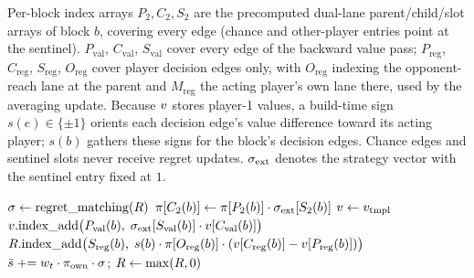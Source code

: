 Per-block index arrays $P_2, C_2, S_2$ are the precomputed dual-lane parent/child/slot
arrays of block $b$, covering every edge (chance and other-player entries point at the
sentinel). $P_{\mathrm{val}}$, $C_{\mathrm{val}}$, $S_{\mathrm{val}}$ cover every edge of the
backward value pass; $P_{\mathrm{reg}}$, $C_{\mathrm{reg}}$, $S_{\mathrm{reg}}$,
$O_{\mathrm{reg}}$
cover player decision edges only, with $O_{\mathrm{reg}}$ indexing the opponent-reach lane at
the parent and $M_{\mathrm{reg}}$ the acting player's own lane there, used by the
averaging update. Because $v$ stores player-1 values, a build-time sign
$s(e) \in \{\pm 1\}$ orients each decision edge's value difference toward its
acting player; $s(b)$ gathers these signs for the block's decision edges.
Chance edges and sentinel slots never receive regret updates.
$\sigma_{\mathrm{ext}}$ denotes the strategy vector with the sentinel entry fixed at $1$.

\begin{algorithm}[t]
\caption{One compiled CFR$^{+}$ iteration under simultaneous updates.}
\label{alg:iteration}
\begin{algorithmic}[1]
\State $\sigma \gets \mathrm{regret\_matching}(R)$ 
 
    \State $\pi[C_2(b)] \gets \pi[P_2(b)] \cdot \sigma_{\mathrm{ext}}[S_2(b)]$
\EndFor
\State $v \gets v_{\mathrm{tmpl}}$ 
 
    \State $v.\mathrm{index\_add}\big(P_{\mathrm{val}}(b),\; \sigma_{\mathrm{ext}}[S_{\mathrm{val}}(b)] \cdot v[C_{\mathrm{val}}(b)]\big)$
    \State $R.\mathrm{index\_add}\big(S_{\mathrm{reg}}(b),\; s(b) \cdot \pi[O_{\mathrm{reg}}(b)] \cdot (v[C_{\mathrm{reg}}(b)] - v[P_{\mathrm{reg}}(b)])\big)$ \label{alg:regretline}
\EndFor
\State $\bar{s} \mathrel{+}= w_t \cdot \pi_{\mathrm{own}} \cdot \sigma$;\qquad
       $R \gets \max(R, 0)$ 
\end{algorithmic}
\end{algorithm}

